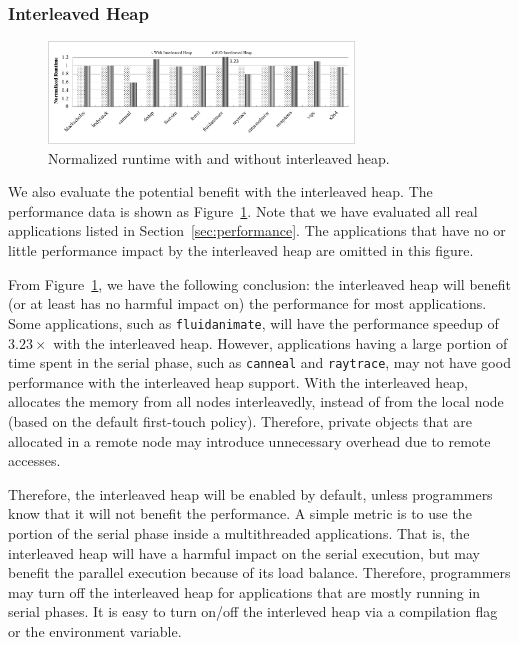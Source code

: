\subsubsection{Interleaved Heap} 
\label{sec:interleavedheap}

\begin{figure}[!h]
    \centering
    \includegraphics[width=3.2in]{figure/interleavedheap.pdf}
    \caption{Normalized runtime with and without  interleaved heap.\label{fig:interleavedheap}}  
\end{figure}

We also evaluate the potential benefit with the  interleaved heap. The performance data is shown as Figure~\ref{fig:interleavedheap}. Note that we have evaluated all real applications listed in Section~\ref{sec:performance}. The applications that have no or little performance impact by the interleaved heap are omitted in this figure. 

From Figure~\ref{fig:interleavedheap}, we have the following conclusion: the interleaved heap will benefit (or at least has no harmful impact on) the performance for most applications. Some applications, such as \texttt{fluidanimate}, will have the performance speedup of $3.23\times$ with the interleaved heap. However, applications having a large portion of time spent in the serial phase, such as \texttt{canneal} and \texttt{raytrace}, may not have good performance with the interleaved heap support. With the interleaved heap, \NM{} allocates the memory from all nodes interleavedly, instead of from the local node (based on the default first-touch policy). Therefore, private objects that are allocated in a remote node may introduce unnecessary overhead due to remote accesses.
 
Therefore, the interleaved heap will be enabled by default, unless programmers know that it will not benefit the performance. A simple metric is to use the portion of the serial phase inside a multithreaded applications.  That is, the interleaved heap will have a harmful impact on the serial execution, but may benefit the parallel execution because of its load balance. Therefore, programmers may turn off the interleaved heap for applications that are mostly running in serial phases. It is easy to turn on/off the interleved heap via a compilation flag or the environment variable.  

